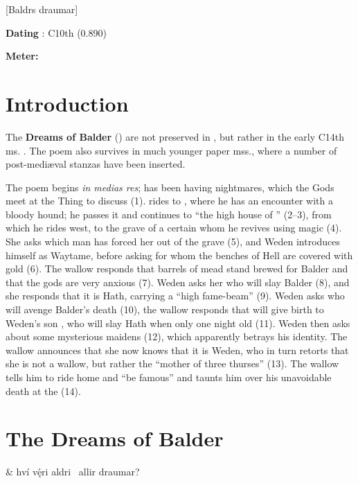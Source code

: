 [Baldrs draumar]
\def\thisBookCode{Baldrsdraumar}

\begin{flushright}%
\textbf{Dating} \parencite{Sapp2022}: C10th (0.890)

\textbf{Meter:} \Fornyrdislag%
\end{flushright}

\section{Introduction}

The \textbf{Dreams of Balder} (\Baldrsdraumar) are not preserved in \Regius, but rather in the early C14th ms. \AM.  The poem also survives in much younger paper mss., where a number of post-mediæval stanzas have been inserted.

The poem begins \emph{in medias res};  has been having nightmares, which the Gods meet at the Thing to discuss (1).   rides to , where he has an encounter with a bloody hound; he passes it and continues to “the high house of ” (2–3), from which he rides west, to the grave of a certain  whom he revives using magic (4). She asks which man has forced her out of the grave (5), and Weden introduces himself as Waytame, before asking for whom the benches of Hell are covered with gold (6). The wallow responds that barrels of mead stand brewed for Balder and that the gods are very anxious (7). Weden asks her who will slay Balder (8), and she responds that it is Hath, carrying a “high fame-beam” (9).  Weden asks who will avenge Balder’s death (10), the wallow responds that  will give birth to Weden’s son , who will slay Hath when only one night old (11).  Weden then asks about some mysterious maidens (12), which apparently betrays his identity.  The wallow announces that she now knows that it is Weden, who in turn retorts that she is not a wallow, but rather the “mother of three thurses” (13). The wallow tells him to ride home and “be famous” and taunts him over his unavoidable death at the  (14).

\section{The Dreams of Balder}

\bvg\bva{}%
 &
hví vę́ri aldri \hld\ allir draumar?\eva

